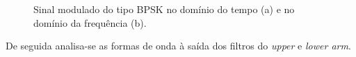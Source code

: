 \documentclass[11pt]{article}
\numberwithin{equation}{section}
\begin{document}
{\begin{figure}[H]
	\centering
	\hspace{8mm}
	\vspace{-0.8em}
	\caption{Sinal modulado do tipo BPSK no domínio do tempo (a) e no domínio da frequência (b).}
	\vspace{-0.8em}
\end{figure}


De seguida analisa-se as formas de onda à saída dos filtros do \textit{upper} e \textit{lower arm}.

}
\end{document}
